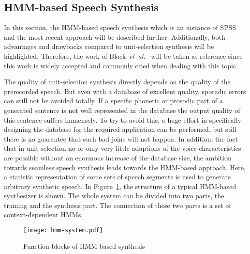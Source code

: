 \subsection{\ac{HMM}-based Speech Synthesis}
\label{subsec:hmmspeech}

In this section, the \ac{HMM}-based speech synthesis which is an instance of \ac{SPSS} and the most recent approach will be described further. Additionally, both advantages and drawbacks compared to unit-selection synthesis will be highlighted. Therefore, the work of Black~\textit{et~al.}~\cite{black:statistical} will be taken as reference since this work is widely accepted and commonly cited when dealing with this topic.

The quality of unit-selection synthesis directly depends on the quality of the prerecorded speech. But even with a database of excellent quality, sporadic errors can still not be avoided totally. If a specific phonetic or prosodic part of a generated sentence is not well represented in the database the output quality of this sentence suffers immensely. To try to avoid this, a huge effort in specifically designing the database for the required application can be performed, but still there is no guarantee that such bad joins will not happen. In addition, the fact that in unit-selection no or only very little adaptions of the voice characteristics are possible without an enormous increase of the database size, the ambition towards seamless speech synthesis leads towards the \ac{HMM}-based approach. Here, a statistic representation of some sets of speech segments is used to generate arbitrary synthetic speech. In Figure~\ref{fig:hmm}, the structure of a typical \ac{HMM}-based synthesizer is shown. The whole system can be divided into two parts, the training and the synthesis part. The connection of these two parts is a set of context-dependent \acp{HMM}. 

\begin{figure}[h]
	\texttt{[image: hmm-system.pdf]}
	\caption{Function blocks of \ac{HMM}-based synthesis~\cite{black:statistical}}
	\label{fig:hmm}
\end{figure}


